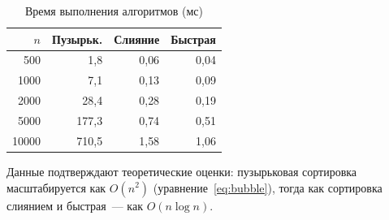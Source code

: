 \begin{table}[H]
    \centering
    \caption{Время выполнения алгоритмов (мс)}
    \label{tab:results}
    \begin{tabular}{|r|r|r|r|}
        \hline
        \textbf{$n$} &
        \textbf{Пузырьк.} &
        \textbf{Слияние} &
        \textbf{Быстрая} \\
        \hline
        500    &   1{,}8  &  0{,}06 &  0{,}04 \\
        \hline
        1000   &   7{,}1  &  0{,}13 &  0{,}09 \\
        \hline
        2000   &  28{,}4  &  0{,}28 &  0{,}19 \\
        \hline
        5000   & 177{,}3  &  0{,}74 &  0{,}51 \\
        \hline
        10000  & 710{,}5  &  1{,}58 &  1{,}06 \\
        \hline
    \end{tabular}
\end{table}

Данные подтверждают теоретические оценки: пузырьковая сортировка
масштабируется как $O(n^2)$ (уравнение~\ref{eq:bubble}), тогда как
сортировка слиянием и быстрая~--- как $O(n \log n)$.
